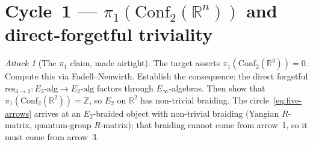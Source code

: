 \documentclass[11pt]{article}
\theoremstyle{definition}
\theoremstyle{remark}
\newtheorem{attack}[thm]{Attack}
\newcommand{\bR}{\mathbb{R}}
\newcommand{\bZ}{\mathbb{Z}}
\newcommand{\Conf}{\mathrm{Conf}}
\newcommand{\Etwo}{E_2}
\newcommand{\Ethree}{E_3}
\newcommand{\Einf}{E_\infty}
\begin{document}
\section{Cycle~1 --- $\pi_1(\Conf_2(\bR^n))$ and direct-forgetful
triviality}

\begin{attack}[The $\pi_1$ claim, made airtight]
\label{att:pi1-airtight}
The target asserts $\pi_1(\Conf_2(\bR^3)) = 0$. Compute this via
Fadell--Neuwirth. Establish the consequence: the direct forgetful
$\mathrm{res}_{3\to 2}\colon \Ethree\text{-alg} \to \Etwo\text{-alg}$
factors through $\Einf$-algebras. Then show that
$\pi_1(\Conf_2(\bR^2)) = \bZ$, so $\Etwo$ on $\bR^2$ has non-trivial
braiding. The circle~\eqref{eq:five-arrows} arrives at an
$\Etwo$-braided object with non-trivial braiding (Yangian
$R$-matrix, quantum-group $R$-matrix); that braiding cannot come
from arrow~1, so it must come from arrow~3.
\end{attack}
\end{document}
